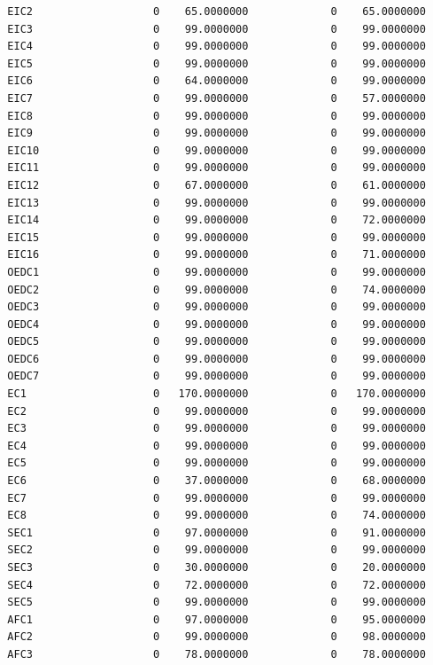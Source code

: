 \documentclass[
  11pt,
  a4paper,
  DIV=12,captions=tableheading,oneside,titlepage]{scrbook}
\begin{document}
\begin{verbatim}
  EIC2                   0    65.0000000             0    65.0000000 
  EIC3                   0    99.0000000             0    99.0000000 
  EIC4                   0    99.0000000             0    99.0000000 
  EIC5                   0    99.0000000             0    99.0000000 
  EIC6                   0    64.0000000             0    99.0000000 
  EIC7                   0    99.0000000             0    57.0000000 
  EIC8                   0    99.0000000             0    99.0000000 
  EIC9                   0    99.0000000             0    99.0000000 
  EIC10                  0    99.0000000             0    99.0000000 
  EIC11                  0    99.0000000             0    99.0000000 
  EIC12                  0    67.0000000             0    61.0000000 
  EIC13                  0    99.0000000             0    99.0000000 
  EIC14                  0    99.0000000             0    72.0000000 
  EIC15                  0    99.0000000             0    99.0000000 
  EIC16                  0    99.0000000             0    71.0000000 
  OEDC1                  0    99.0000000             0    99.0000000 
  OEDC2                  0    99.0000000             0    74.0000000 
  OEDC3                  0    99.0000000             0    99.0000000 
  OEDC4                  0    99.0000000             0    99.0000000 
  OEDC5                  0    99.0000000             0    99.0000000 
  OEDC6                  0    99.0000000             0    99.0000000 
  OEDC7                  0    99.0000000             0    99.0000000 
  EC1                    0   170.0000000             0   170.0000000 
  EC2                    0    99.0000000             0    99.0000000 
  EC3                    0    99.0000000             0    99.0000000 
  EC4                    0    99.0000000             0    99.0000000 
  EC5                    0    99.0000000             0    99.0000000 
  EC6                    0    37.0000000             0    68.0000000 
  EC7                    0    99.0000000             0    99.0000000 
  EC8                    0    99.0000000             0    74.0000000 
  SEC1                   0    97.0000000             0    91.0000000 
  SEC2                   0    99.0000000             0    99.0000000 
  SEC3                   0    30.0000000             0    20.0000000 
  SEC4                   0    72.0000000             0    72.0000000 
  SEC5                   0    99.0000000             0    99.0000000 
  AFC1                   0    97.0000000             0    95.0000000 
  AFC2                   0    99.0000000             0    98.0000000 
  AFC3                   0    78.0000000             0    78.0000000 

\end{verbatim}
\end{document}
